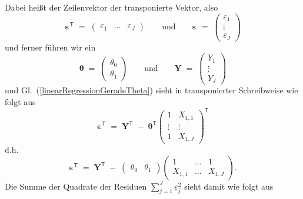 Dabei heißt der Zeilenvektor der transponierte Vektor, also
\begin{equation}
\boldsymbol{\varepsilon}^\mathsf{T} \; = \; \left(\begin{array}{ccc}
\varepsilon_1 & \dots & \varepsilon_J
\end{array}
\right) \qquad \mathrm{und}  \qquad
\boldsymbol{\varepsilon} \; = \; \left(
\begin{array}{c}
\varepsilon_1\\
\vdots \\
\varepsilon_J
\end{array}
\right)
\end{equation}
und ferner führen wir ein
\begin{equation}
\boldsymbol{\theta} \; = \;
\left(
\begin{array}{c}
\theta_0\\
\theta_1
\end{array}
\right) \qquad \mathrm{und}  \qquad
\mathbf{Y}  \; = \;\left(
\begin{array}{c}
Y_{1}\\
\vdots \\
Y_{J}
\end{array}
\right)
\end{equation}
und Gl.~(\ref{linearRegressionGeradeTheta}) sieht in transponierter Schreibweise
wie folgt aus
\begin{equation}
\boldsymbol{\varepsilon}^\mathsf{T} \; = \;
\mathbf{Y}^\mathsf{T}
\; - \;
\boldsymbol{\theta}^\mathsf{T} \left(
\begin{array}{cc}
1 &  X_{1,1} \\
\vdots & \vdots\\
1 & X_{1,J}
\end{array}
\right)^\mathsf{T}
\label{linearRegressionGeradeTransponiert}
\end{equation}
d.h.
\begin{equation}
\boldsymbol{\varepsilon}^\mathsf{T} \; = \;
\mathbf{Y}^\mathsf{T}
\; - \;
\left(
\begin{array}{cc}
\theta_0 &
\theta_1
\end{array}
\right) \left(
\begin{array}{ccc}
1 &  \dots & 1 \\
X_{1,1} & \dots & X_{1,J}
\end{array}
\right).
\label{linearRegressionGeradeUmform}
\end{equation}
Die Summe der Quadrate der Residuen $\sum_{j=1}^J \varepsilon_j^2$  sieht damit wie
folgt aus
